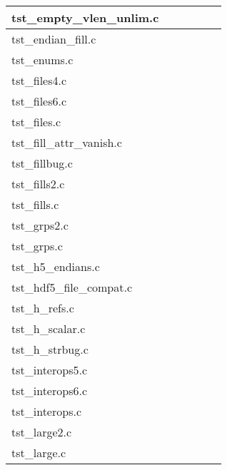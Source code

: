 \begin{table}[H]
\begin{tabular}{|l|c|c|c|c|c|}
tst\_empty\_vlen\_unlim.c   &   &   &   &   &   \\ \hline
tst\_endian\_fill.c   &   &   &   &   &   \\ \hline
tst\_enums.c   &   &   &   &   &   \\ \hline
tst\_files4.c   &   &   &   &   &   \\ \hline
tst\_files6.c   &   &   &   &   &   \\ \hline
tst\_files.c   &   &   &   &   &   \\ \hline
tst\_fill\_attr\_vanish.c   &   &   &   &   &   \\ \hline
tst\_fillbug.c   &   &   &   &   &   \\ \hline
tst\_fills2.c   &   &   &   &   &   \\ \hline
tst\_fills.c   &   &   &   &   &   \\ \hline
tst\_grps2.c   &   &   &   &   &   \\ \hline
tst\_grps.c   &   &   &   &   &   \\ \hline
tst\_h5\_endians.c   &   &   &   &   &   \\ \hline
tst\_hdf5\_file\_compat.c   &   &   &   &   &   \\ \hline
tst\_h\_refs.c   &   &   &   &   &   \\ \hline
tst\_h\_scalar.c   &   &   &   &   &   \\ \hline
tst\_h\_strbug.c   &   &   &   &   &   \\ \hline
tst\_interops5.c   &   &   &   &   &   \\ \hline
tst\_interops6.c   &   &   &   &   &   \\ \hline
tst\_interops.c   &   &   &   &   &   \\ \hline
tst\_large2.c   &   &   &   &   &   \\ \hline
tst\_large.c   &   &   &   &   &   \\ \hline
\end{tabular}
\caption{}
\end{table}

\clearpage

